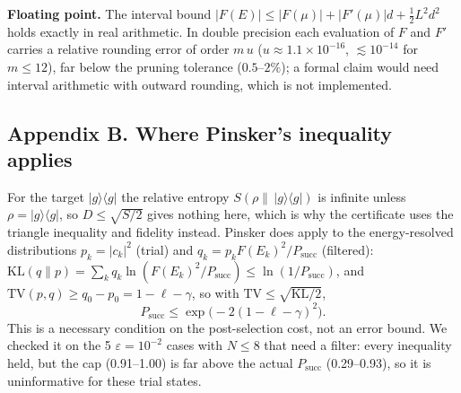 \documentclass[
]{article}
\begin{document}
\textbf{Floating point.} The interval bound
\(|F(E)|\le|F(\mu)|+|F'(\mu)|d+\tfrac12L^2d^2\) holds exactly in real
arithmetic. In double precision each evaluation of \(F\) and \(F'\)
carries a relative rounding error of order \(m\,u\)
(\(u\approx1.1\times10^{-16}\), \(\lesssim10^{-14}\) for \(m\le12\)),
far below the pruning tolerance (\(0.5\)--\(2\%\)); a formal claim would
need interval arithmetic with outward rounding, which is not
implemented.

\hypertarget{appendix-b.-where-pinskers-inequality-applies}{%
\subsection{Appendix B. Where Pinsker's inequality
applies}\label{appendix-b.-where-pinskers-inequality-applies}}

For the target \(|g\rangle\langle g|\) the relative entropy
\(S(\rho\|\,|g\rangle\langle g|)\) is infinite unless
\(\rho=|g\rangle\langle g|\), so \(D\le\sqrt{S/2}\) gives nothing here,
which is why the certificate uses the triangle inequality and fidelity
instead. Pinsker does apply to the energy-resolved distributions
\(p_k=|c_k|^2\) (trial) and \(q_k=p_kF(E_k)^2/P_{\mathrm{succ}}\)
(filtered):
\(\mathrm{KL}(q\|p)=\sum_kq_k\ln(F(E_k)^2/P_{\mathrm{succ}})\le\ln(1/P_{\mathrm{succ}})\),
and \(\mathrm{TV}(p,q)\ge q_0-p_0=1-\ell-\gamma\), so with
\(\mathrm{TV}\le\sqrt{\mathrm{KL}/2}\),
\[P_{\mathrm{succ}}\le\exp\!\big(-2(1-\ell-\gamma)^2\big).\] This is a
necessary condition on the post-selection cost, not an error bound. We
checked it on the 5 \(\varepsilon=10^{-2}\) cases with \(N\le8\) that
need a filter: every inequality held, but the cap (0.91--1.00) is far
above the actual \(P_{\mathrm{succ}}\) (0.29--0.93), so it is
uninformative for these trial states.
\end{document}

